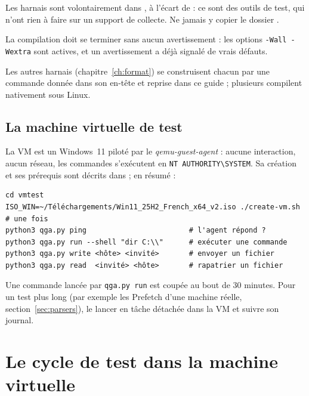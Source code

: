 \documentclass[11pt,a4paper,oneside]{report}
\begin{document}
\begin{attention}
Les harnais sont volontairement dans , à
l'écart de  : ce sont des outils de test, qui n'ont rien à
faire sur un support de collecte. Ne jamais y copier le dossier
.
\end{attention}

La compilation doit se terminer sans aucun avertissement : les options
\texttt{-Wall -Wextra} sont actives, et un avertissement a déjà signalé de vrais
défauts.

Les autres harnais (chapitre~\ref{ch:format}) se construisent chacun par une
commande donnée dans son en-tête et reprise dans ce guide ; plusieurs compilent
nativement sous Linux.

\section{La machine virtuelle de test}

La VM est un Windows~11 piloté par le \emph{qemu-guest-agent} : aucune
interaction, aucun réseau, les commandes s'exécutent en
\texttt{NT AUTHORITY\textbackslash SYSTEM}. Sa création et ses prérequis sont
décrits dans  ; en résumé :

\begin{lstlisting}
cd vmtest
ISO_WIN=~/Téléchargements/Win11_25H2_French_x64_v2.iso ./create-vm.sh   # une fois
python3 qga.py ping                        # l'agent répond ?
python3 qga.py run --shell "dir C:\\"      # exécuter une commande
python3 qga.py write <hôte> <invité>       # envoyer un fichier
python3 qga.py read  <invité> <hôte>       # rapatrier un fichier
\end{lstlisting}

\begin{note}
Une commande lancée par \texttt{qga.py run} est coupée au bout de 30 minutes.
Pour un test plus long (par exemple les Prefetch d'une machine réelle,
section~\ref{sec:parsers}), le lancer en tâche détachée dans la VM et suivre son
journal.
\end{note}

\chapter{Le cycle de test dans la machine virtuelle}\label{ch:vm}
\end{document}
